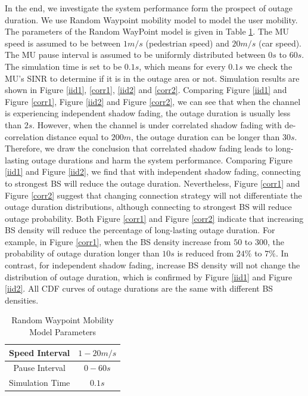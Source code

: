  \par In the end, we investigate the system performance form the prospect of outage duration. We use Random Waypoint mobility model to model the user mobility. The parameters of the Random WayPoint model is given in Table \ref{RWP}. The MU speed is assumed to be between $1m/s$ (pedestrian speed) and $20m/s$ (car speed). The MU pause interval is assumed to be uniformly distributed between $0s$ to $60s$. The simulation time is set to be $0.1s$, which means for every $0.1s$ we check the MU's SINR to determine if it is in the outage area or not. Simulation results are shown in Figure \ref{iid1}, \ref{corr1}, \ref{iid2} and \ref{corr2}. Comparing Figure \ref{iid1} and Figure \ref{corr1}, Figure \ref{iid2} and Figure \ref{corr2}, we can see that when the channel is experiencing independent shadow fading, the outage duration is usually less than $2s$. However,  when the channel is under correlated shadow fading with de-correlation distance equal to $200m$, the outage duration can be longer than $30s$. Therefore, we draw the conclusion that correlated shadow fading leads to long-lasting outage durations and harm the system performance. Comparing Figure \ref{iid1} and Figure \ref{iid2}, we find that with independent shadow fading, connecting to strongest BS will reduce the outage duration.  Nevertheless, Figure \ref{corr1} and Figure \ref{corr2} suggest that changing connection strategy will not differentiate the outage duration distributions, although connecting to strongest BS will reduce outage probability. Both Figure \ref{corr1} and Figure \ref{corr2} indicate that increasing BS density will reduce the percentage of long-lasting outage duration. For example, in Figure \ref{corr1}, when the BS density increase from $50$ to $300$, the probability of outage duration longer than $10s$ is reduced from $24\%$ to $7\%$. In contrast, for independent shadow fading, increase BS density will not change the distribution of outage duration, which is confirmed by Figure \ref{iid1} and Figure \ref{iid2}. All CDF curves of outage durations are the same with different BS densities. 
 \begin{table}
 \centering
 \caption{\label{RWP}Random Waypoint Mobility Model Parameters}

 \begin{tabular}{|c|c|}

 \hline
 Speed Interval & $1 - 20m/s$\\
 \hline
 Pause Interval & $0 - 60s$\\
 \hline
 Simulation Time & $0.1s$\\
 \hline
 \end{tabular}

 \end{table}

